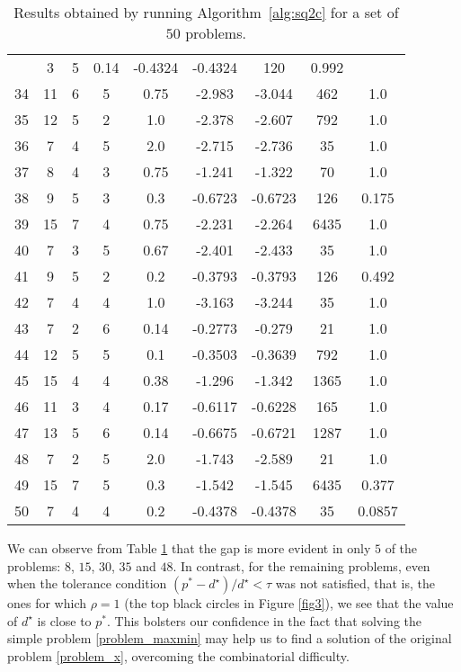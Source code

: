 \documentclass[smallextended,referee,envcountsect]{svjour3}
\begin{document}
\begin{table}[htbp]
\begin{tabular}{ccccccccc}
& 3 & 5 & 0.14 & -0.4324 & -0.4324 & 120 & 0.992\\34 & 11 & 6 & 5 & 0.75 & -2.983 & -3.044 & 462 & 1.0\\35 & 12 & 5 & 2 & 1.0 & -2.378 & -2.607 & 792 & 1.0\\36 & 7 & 4 & 5 & 2.0 & -2.715 & -2.736 & 35 & 1.0\\37 & 8 & 4 & 3 & 0.75 & -1.241 & -1.322 & 70 & 1.0\\38 & 9 & 5 & 3 & 0.3 & -0.6723 & -0.6723 & 126 & 0.175\\39 & 15 & 7 & 4 & 0.75 & -2.231 & -2.264 & 6435 & 1.0\\40 & 7 & 3 & 5 & 0.67 & -2.401 & -2.433 & 35 & 1.0\\41 & 9 & 5 & 2 & 0.2 & -0.3793 & -0.3793 & 126 & 0.492\\42 & 7 & 4 & 4 & 1.0 & -3.163 & -3.244 & 35 & 1.0\\43 & 7 & 2 & 6 & 0.14 & -0.2773 & -0.279 & 21 & 1.0\\44 & 12 & 5 & 5 & 0.1 & -0.3503 & -0.3639 & 792 & 1.0\\45 & 15 & 4 & 4 & 0.38 & -1.296 & -1.342 & 1365 & 1.0\\46 & 11 & 3 & 4 & 0.17 & -0.6117 & -0.6228 & 165 & 1.0\\47 & 13 & 5 & 6 & 0.14 & -0.6675 & -0.6721 & 1287 & 1.0\\48 & 7 & 2 & 5 & 2.0 & -1.743 & -2.589 & 21 & 1.0\\49 & 15 & 7 & 5 & 0.3 & -1.542 & -1.545 & 6435 & 0.377\\50 & 7 & 4 & 4 & 0.2 & -0.4378 & -0.4378 & 35 & 0.0857\\
\hline
\end{tabular}
\caption{Results obtained by running Algorithm~\ref{alg:sq2c} for a set of $50$ problems.}
\label{tb:output}
\end{table}

We can observe from Table \ref{tb:output} that the gap is more evident in only $5$ 
of the problems: $8$, $15$, $30$, $35$ and $48$. In contrast, for the remaining problems, 
even when the tolerance condition ${(p^*-d^\star)}/{d^\star} < \tau$ was not satisfied, 
that is, the ones for which $\rho = 1$ (the top black circles in Figure \ref{fig3}), 
we see that the value of $d^\star$ is close to $p^*$. This bolsters our confidence in the 
fact that solving the simple problem \eqref{problem_maxmin} may help us to find a 
solution of the original problem \eqref{problem_x}, overcoming the combinatorial 
difficulty.
\end{document}
